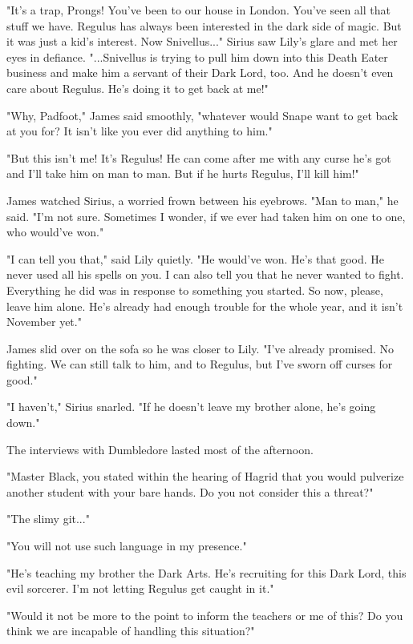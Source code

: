 "It's a trap, Prongs! You've been to our house in London. You've seen all that stuff we have. Regulus has always been interested in the dark side of magic. But it was just a kid's interest. Now Snivellus..." Sirius saw Lily's glare and met her eyes in defiance. "...Snivellus is trying to pull him down into this Death Eater business and make him a servant of their Dark Lord, too. And he doesn't even care about Regulus. He's doing it to get back at me!"

"Why, Padfoot," James said smoothly, "whatever would Snape want to get back at you for? It isn't like you ever did anything to him."

"But this isn't me! It's Regulus! He can come after me with any curse he's got and I'll take him on man to man. But if he hurts Regulus, I'll kill him!"

James watched Sirius, a worried frown between his eyebrows. "Man to man," he said. "I'm not sure. Sometimes I wonder, if we ever had taken him on one to one, who would've won."

"I can tell you that," said Lily quietly. "He would've won. He's that good. He never used all his spells on you. I can also tell you that he never wanted to fight. Everything he did was in response to something you started. So now, please, leave him alone. He's already had enough trouble for the whole year, and it isn't November yet."

James slid over on the sofa so he was closer to Lily. "I've already promised. No fighting. We can still talk to him, and to Regulus, but I've sworn off curses for good."

"I haven't," Sirius snarled. "If he doesn't leave my brother alone, he's going down."

The interviews with Dumbledore lasted most of the afternoon.

"Master Black, you stated within the hearing of Hagrid that you would pulverize another student with your bare hands. Do you not consider this a threat?"

"The slimy git..."

"You will not use such language in my presence."

"He's teaching my brother the Dark Arts. He's recruiting for this Dark Lord, this evil sorcerer. I'm not letting Regulus get caught in it."

"Would it not be more to the point to inform the teachers or me of this? Do you think we are incapable of handling this situation?"

